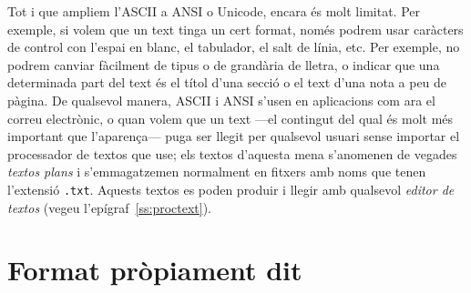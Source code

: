Tot i que ampliem l'ASCII a ANSI o Unicode, encara és molt limitat.
Per exemple, si volem que un text tinga un cert format, només podrem
usar caràcters de control con l'espai en blanc, el tabulador, el salt
de línia, etc.  Per exemple, no podrem canviar fàcilment de tipus o de
grandària de lletra, o indicar que una determinada part del text és el
títol d'una secció o el text d'una nota a peu de pàgina. De qualsevol
manera, ASCII i ANSI s'usen en aplicacions com ara el correu
electrònic, o quan volem que un text ---el contingut del qual és molt
més important que l'aparença--- puga ser llegit per qualsevol usuari
sense importar el processador de textos que use; els textos d'aquesta
mena s'anomenen de vegades \emph{textos plans} i s'emmagatzemen
normalment en fitxers amb noms que tenen l'extensió \texttt{.txt}.
Aquests textos es poden produir i llegir amb qualsevol \emph{editor de
  textos} (vegeu l'epígraf~\ref{ss:proctext}).


\section{Format pròpiament dit}

